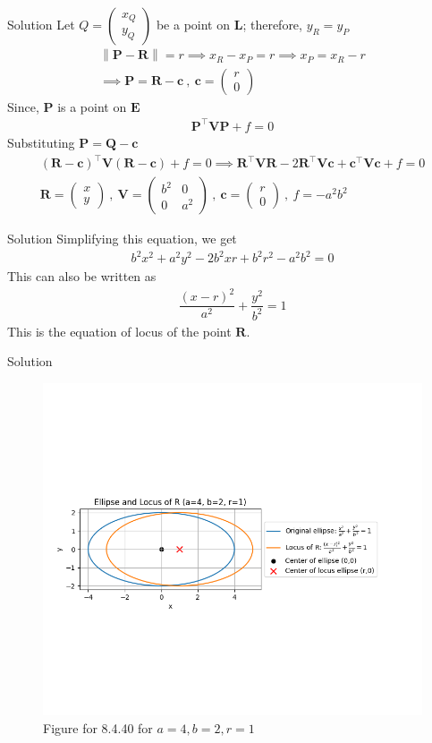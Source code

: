 \documentclass{beamer}
\let\vec\mathbf
\providecommand{\brak}[1]{\ensuremath{\left(#1\right)}}
\theoremstyle{remark}
\providecommand{\norm}[1]{\left\lVert#1\right\rVert}
\newcommand{\myvec}[1]{\ensuremath{\begin{pmatrix}#1\end{pmatrix}}}
\begin{document}
\begin{frame}{Solution}
Let $Q=\myvec{x_Q \\ y_Q}$ be a point on $\vec{L}$; therefore, $y_R=y_P$ 
\begin{align}
    \norm{\vec{P}-\vec{R}}=r \implies x_R - x_P =r \implies x_P = x_R - r \\\implies \vec{P} = \vec{R} -\vec{c}\  ,\  \vec{c}=\myvec{r \\ 0}
\end{align}
Since, $\vec{P}$ is a point on $\vec{E}$
\begin{align}
    \vec{P}^{\top}\vec{V}\vec{P} + f=0
\end{align}
Substituting $\vec{P} = \vec{Q} -\vec{c}$
\begin{align}
    \brak{\vec{R} -\vec{c}}^{\top}\vec{V}\brak{\vec{R} -\vec{c}} + f=0 \implies \vec{R}^{\top}\vec{V}\vec{R} - 2\vec{R}^{\top}\vec{V}\vec{c} + \vec{c}^{\top}\vec{V}\vec{c}+f=0\\
    \vec{R}= \myvec{x\\y} \ , \ \vec{V}=\myvec{b^2 & 0 \\ 0 & a^2} \ , \ \vec{c}=\myvec{r\\0} \ , \ f=-a^2b^2
\end{align}
\end{frame}

\begin{frame}{Solution}
Simplifying this equation, we get
\begin{align}
    b^2x^2 + a^2y^2 - 2b^2 xr + b^2r^2 - a^2b^2=0
\end{align}
This can also be written as 
\begin{align}
    \dfrac{\brak{x-r}^2}{a^2} + \dfrac{y^2}{b^2} =1
\end{align}
This is the equation of locus of the point $\vec{R}$.
\end{frame}
\begin{frame}{Solution}
    \begin{figure}[H]
        \centering
        \includegraphics[width=0.5\columnwidth]{figs/1.png}
        \caption{Figure for 8.4.40 for $a=4, b=2, r=1$}
        \label{fig:placeholder}
    \end{figure}
\end{frame}
\end{document}
